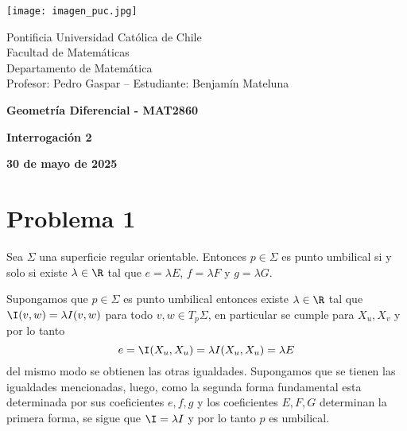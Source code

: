 \documentclass{article}
\begin{document}
\begin{minipage}{2.5cm}
    \texttt{[image: imagen\_puc.jpg]}
\end{minipage}
\begin{minipage}{14cm}
    {\sc Pontificia Universidad Católica de Chile\\
    Facultad de Matemáticas\\
    Departamento de Matemática\\
    Profesor: Pedro Gaspar -- Estudiante: Benjamín Mateluna}
\end{minipage}
\vspace{1ex}

{\centerline{\bf Geometría Diferencial - MAT2860}
\centerline{\bf Interrogación 2}}
\centerline{\bf 30 de mayo de 2025}

\section*{Problema 1}
\begin{lema}
    Sea $\Sigma$ una superficie regular orientable. Entonces $p\in\Sigma$ es punto umbilical si y
    solo si existe $\lambda\in\R$ tal que $e=\lambda E$, $f=\lambda F$ y $g=\lambda G$.
\end{lema}
\begin{dem}
    Supongamos que $p\in\Sigma$ es punto umbilical entonces existe $\lambda\in\R$ tal que 
    $\I(v,w)=\lambda I(v,w)$ para todo $v,w\in T_{p}\Sigma$, en particular se cumple para 
    $X_{u},X_{v}$ y por lo tanto
    \begin{equation*}
        e=\I(X_{u},X_{u})=\lambda I(X_{u},X_{u})=\lambda E
    \end{equation*}
    del mismo modo se obtienen las otras igualdades. Supongamos que se tienen las igualdades 
    mencionadas, luego, como la segunda forma fundamental esta determinada por sus coeficientes 
    $e,f,g$ y los coeficientes $E,F,G$ determinan la primera forma, se sigue que $\I=\lambda I$ 
    y por lo tanto $p$ es umbilical.
\end{dem}
\end{document}
